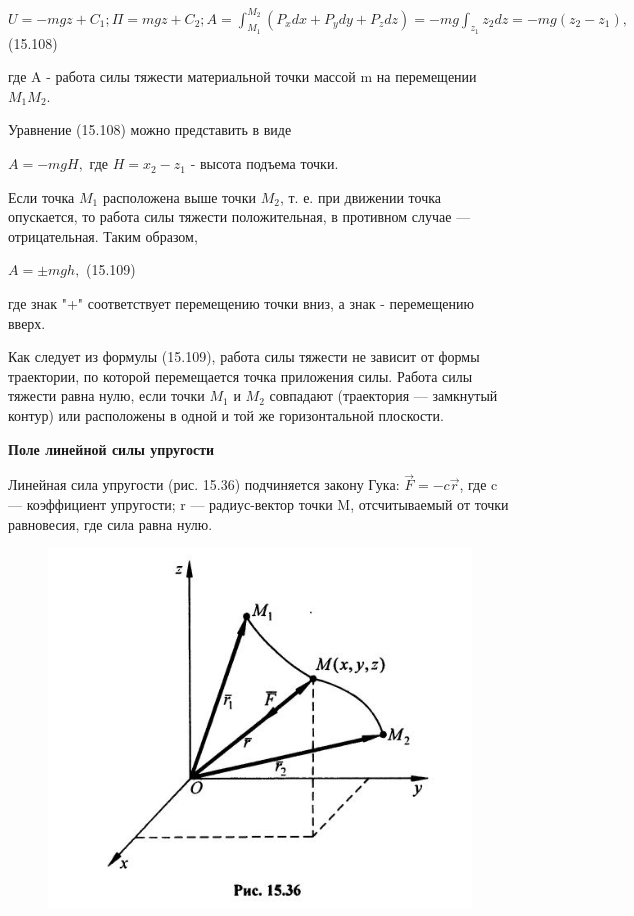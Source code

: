 {\begin{center}
    \par $U=-mgz+C_{1}; \Pi = mgz +C_{2}; A=\int_{M_{1}}^{M_{2}}(P_{x}dx + P_{y}dy + P_{z}dz) = -mg\int_{z_{1}}{z_{2}}dz=-mg(z_{2}-z_{1}),$  \qquad (15.108)
    
    \par где A - работа силы тяжести материальной точки массой m на перемещении $M_{1}M_{2}$.
    
    \par Уравнение (15.108) можно представить в виде
    
    \par $A=-mgH,$ где $H=x_{2} -z_{1}$ - высота подъема точки.
    
    \par Если точка  $M_{1}$ расположена выше точки  $M_{2}$, т. е. при движении точка опускается, то работа силы тяжести положительная, в противном случае — отрицательная. Таким образом,
    
    \par $A=\pm mgh,$  \qquad (15.109) 
    \par где знак "+" соответствует перемещению точки вниз, а знак - перемещению вверх.

    \par Как следует из формулы (15.109), работа силы тяжести не зависит от формы траектории, по которой перемещается точка приложения силы. Работа силы тяжести равна нулю, если точки $M_{1}$ и $M_{2}$ совпадают (траектория — замкнутый  контур)  или  расположены  в  одной  и  той  же  горизонтальной плоскости.

    \par \textbf{Поле линейной силы упругости}

    \par Линейная сила упругости (рис. 15.36) подчиняется закону Гука: $\Vec{F} = -c\vec{r} $, где c — коэффициент упругости; r — радиус-вектор точки M, отсчитываемый от точки равновесия, где сила равна нулю.
    
    \begin{figure}[H]
    \centering\includegraphics[scale=0.5]{img/15.36.JPG} 
    \end{figure}
    

\end{center}}
